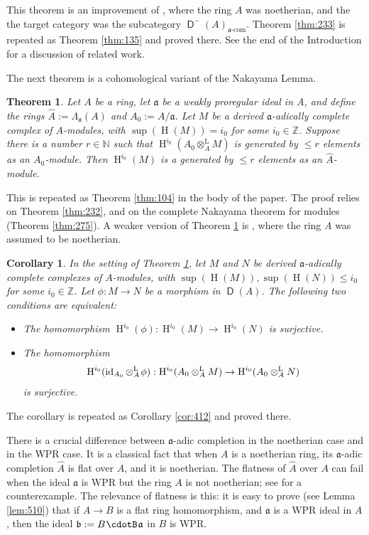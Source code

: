 \documentclass[10pt]{amsart}
\newtheorem{thm}[equation]{Theorem}
\newtheorem{cor}[equation]{Corollary}
\theoremstyle{definition}
\numberwithin{equation}{section}
\newcommand{\opn}{\operatorname}
\newcommand{\cat}[1]{\operatorname{\mathsf{#1}}}
\newcommand{\cd}{\mspace{1.3mu}{\cdotB}\mspace{1.3mu}}
\newcommand{\rmitem}[1]{\item[\textrm{(#1)}]}
\newcommand{\mfrak}[1]{\mathfrak{#1}}
\newcommand{\mrm}[1]{\mathrm{#1}}
\newcommand{\La}{\Lambda}
\renewcommand{\a}{\mfrak{a}}
\renewcommand{\b}{\mfrak{b}}
\newcommand{\Z}{\mathbb{Z}}
\newcommand{\N}{\mathbb{N}}
\newcommand{\tup}[1]{\textrm{#1}}
\newcommand{\ot}{\otimes}
\newcommand{\what}[1]{\widehat{#1}}
\newcommand{\msp}[1]{\mspace{#1 mu}}
\begin{document}
This theorem is an improvement of \cite[Theorem 1.19]{PSY2}, where the ring $A$
was noetherian, and the the target category
was the subcategory $\cat{D}^{-}(A)_{\tup{$\a$-com}}$.
Theorem \ref{thm:233} is repeated as Theorem \ref{thm:135}  and
proved there.
See the end of the Introduction for a discussion of related work.

The next theorem is a cohomological variant of the Nakayama Lemma.

\begin{thm} \label{thm:207}
Let $A$ be a ring, let $\a$ be a weakly proregular ideal in $A$, and
define the rings $\what{A} := \La_{\a}(A)$ and $A_0 := A / \a$.
Let $M$ be a derived $\a$-adically complete complex of $A$-modules,
with $\opn{sup}(\opn{H}(M)) = i_0$ for some $i_0 \in \Z$.
Suppose there is a number $r \in \N$ such that
$\opn{H}^{i_0}(A_0 \ot^{\mrm{L}}_{A} M)$
is generated by $\leq r$ elements as an $A_0$-module.
Then $\opn{H}^{i_0}(M)$ is a generated by $\leq r$ elements as an
$\what{A}$-module.
\end{thm}

This is repeated as Theorem \ref{thm:104} in the body of the paper.
The proof relies on Theorem \ref{thm:232}, and on the complete Nakayama theorem
for modules (Theorem \ref{thm:275}).
A weaker version of Theorem \ref{thm:207}
is \cite[Theorem 2.2]{PSY2}, where the ring $A$ was assumed to be noetherian.

\begin{cor} \label{cor:400}
In the setting of Theorem \ref{thm:207},
let $M$ and $N$ be derived $\a$-adically complete
complexes of $A$-modules, with
$\opn{sup}(\opn{H}(M)), \opn{sup}(\opn{H}(N)) \leq i_0$ for some
$i_0 \in \Z$.
Let $\phi : M \to  N$ be a morphism
in $\cat{D}(A)$.
The following two conditions are equivalent:
\begin{itemize}
\rmitem{i} The homomorphism
$\opn{H}^{i_0}(\phi) : \opn{H}^{i_0}(M) \to \opn{H}^{i_0}(N)$ is surjective.

\rmitem{ii} The homomorphism
\[ \opn{H}^{i_0}(\opn{id}_{A_0} \ot^{\mrm{L}}_{A} \msp{2} \phi) :
\opn{H}^{i_0}(A_0 \ot^{\mrm{L}}_{A} M) \to
\opn{H}^{i_0}(A_0 \ot^{\mrm{L}}_{A} N) \]
is surjective.
\end{itemize}
\end{cor}

The corollary is repeated as Corollary \ref{cor:412} and proved there.

There is a crucial difference between $\a$-adic completion in the noetherian
case and in the WPR case.
It is a classical fact that when $A$ is a noetherian ring, its
$\a$-adic completion $\what{A}$ is flat over $A$, and it is noetherian.
The flatness of $\what{A}$ over $A$ can fail when the ideal $\a$ is WPR but the
ring $A$ is not noetherian; see \cite[Theorem 7.2]{Ye4} for a counterexample.
The relevance of flatness is this: it is easy to prove (see Lemma
\ref{lem:510}) that if
$A \to B$ is a flat ring homomorphism, and $\a$ is a WPR ideal in $A$, then the
ideal $\b := B \cd \a$ in $B$ is WPR.
\end{document}
